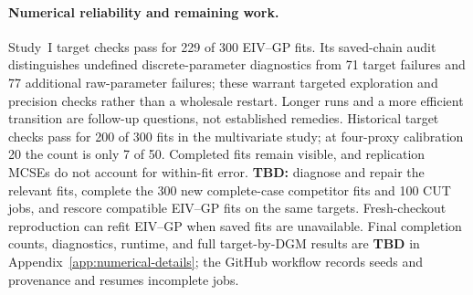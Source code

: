 \paragraph{Numerical reliability and remaining work.}
Study~I target checks pass for 229 of 300 EIV--GP fits. Its saved-chain audit distinguishes undefined discrete-parameter diagnostics from 71 target failures and 77 additional raw-parameter failures; these warrant targeted exploration and precision checks rather than a wholesale restart. Longer runs and a more efficient transition are follow-up questions, not established remedies. Historical target checks pass for 200 of 300 fits in the multivariate study; at four-proxy calibration 20 the count is only 7 of 50. Completed fits remain visible, and replication MCSEs do not account for within-fit error. \textbf{TBD:} diagnose and repair the relevant fits, complete the 300 new complete-case competitor fits and 100 CUT jobs, and rescore compatible EIV--GP fits on the same targets. Fresh-checkout reproduction can refit EIV--GP when saved fits are unavailable. Final completion counts, diagnostics, runtime, and full target-by-DGM results are \textbf{TBD} in Appendix~\ref{app:numerical-details}; the GitHub workflow records seeds and provenance and resumes incomplete jobs.
